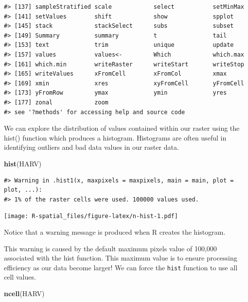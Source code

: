\documentclass[]{book}
\newenvironment{Shaded}{\begin{snugshade}}{\end{snugshade}}
\newcommand{\KeywordTok}[1]{\textcolor[rgb]{0.13,0.29,0.53}{\textbf{#1}}}
\newcommand{\NormalTok}[1]{#1}
\begin{document}
\begin{verbatim}
#> [137] sampleStratified scale            select           setMinMax       
#> [141] setValues        shift            show             spplot          
#> [145] stack            stackSelect      subs             subset          
#> [149] Summary          summary          t                tail            
#> [153] text             trim             unique           update          
#> [157] values           values<-         Which            which.max       
#> [161] which.min        writeRaster      writeStart       writeStop       
#> [165] writeValues      xFromCell        xFromCol         xmax            
#> [169] xmin             xres             xyFromCell       yFromCell       
#> [173] yFromRow         ymax             ymin             yres            
#> [177] zonal            zoom            
#> see '?methods' for accessing help and source code
\end{verbatim}

We can explore the distribution of values contained within our raster
using the hist() function which produces a histogram. Histograms are
often useful in identifying outliers and bad data values in our raster
data.

\begin{Shaded}
\begin{Highlighting}[]
\KeywordTok{hist}\NormalTok{(HARV)}
\end{Highlighting}
\end{Shaded}

\begin{verbatim}
#> Warning in .hist1(x, maxpixels = maxpixels, main = main, plot = plot, ...):
#> 1% of the raster cells were used. 100000 values used.
\end{verbatim}

\texttt{[image: R-spatial\_files/figure-latex/n-hist-1.pdf]}

Notice that a warning message is produced when R creates the histogram.

This warning is caused by the default maximum pixels value of 100,000
associated with the hist function. This maximum value is to ensure
processing efficiency as our data become larger! We can force the
\texttt{hist} function to use all cell values.

\begin{Shaded}
\begin{Highlighting}[]
\KeywordTok{ncell}\NormalTok{(HARV)}
\end{Highlighting}
\end{Shaded}
\end{document}
